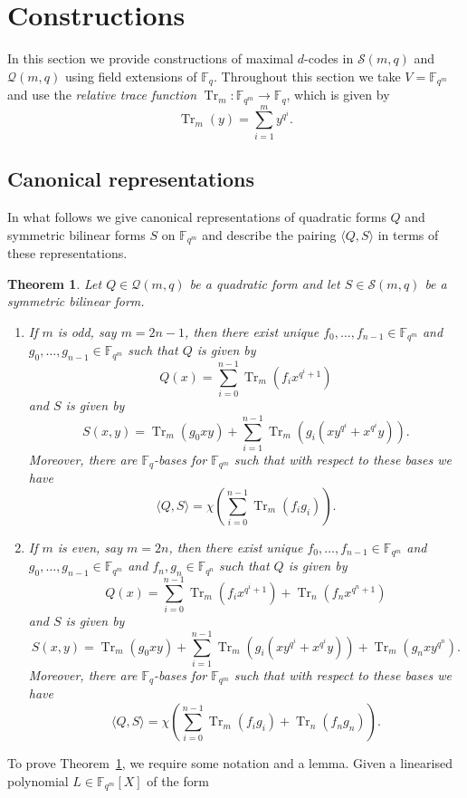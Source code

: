\documentclass[10pt]{article}
\newtheorem{theorem}{Theorem}[section]
\theoremstyle{definition}
\newcommand{\FF}{\mathbb{F}}
\newcommand{\Q}{\mathscr{Q}}
\renewcommand{\S}{\mathscr{S}}
\newcommand{\ang}[1]{\langle#1\rangle}
\DeclareMathOperator{\Tr}{Tr}
\begin{document}
\section{Constructions}
\label{sec:Constructions}

In this section we provide constructions of maximal $d$-codes in $\S(m,q)$ and $\Q(m,q)$ using field extensions of $\FF_q$. Throughout this section we take $V=\FF_{q^m}$ and use the \emph{relative trace function} $\Tr_m:\FF_{q^m}\to\FF_q$, which is given by
\[
\Tr_m(y)=\sum_{i=1}^my^{q^i}.
\]

\subsection{Canonical representations}

In what follows we give canonical representations of quadratic forms $Q$ and symmetric bilinear forms $S$ on $\FF_{q^m}$ and describe the pairing $\ang{Q,S}$ in terms of these representations.
\begin{theorem}
\label{thm:sym_quad_unique_representation}
Let $Q\in\Q(m,q)$ be a quadratic form and let $S\in\S(m,q)$ be a symmetric bilinear form.
\begin{enumerate}
\item If $m$ is odd, say $m=2n-1$, then there exist unique $f_0,\dots,f_{n-1}\in\FF_{q^m}$ and $g_0,\dots,g_{n-1}\in\FF_{q^m}$ such that $Q$ is given by
\[
Q(x)=\sum_{i=0}^{n-1}\Tr_m(f_ix^{q^i+1})
\]
and $S$ is given by
\[
S(x,y)=\Tr_m(g_0xy)+\sum_{i=1}^{n-1}\Tr_m(g_i(xy^{q^i}+x^{q^i}y)).
\]
Moreover, there are $\FF_q$-bases for $\FF_{q^m}$ such that with respect to these bases we have
\[
\ang{Q,S}=\chi\left(\sum\limits_{i=0}^{n-1}\Tr_m(f_ig_i)\right).
\]

\item If $m$ is even, say $m=2n$, then there exist unique $f_0,\dots,f_{n-1}\in\FF_{q^m}$ and $g_0,\dots,g_{n-1}\in\FF_{q^m}$ and $f_n,g_n\in\FF_{q^n}$ such that $Q$ is given by
\[
Q(x)=\sum_{i=0}^{n-1}\Tr_m(f_ix^{q^i+1})+\Tr_n(f_nx^{q^n+1})
\]
and $S$ is given by
\[
S(x,y)=\Tr_m(g_0xy)+\sum_{i=1}^{n-1}\Tr_m(g_i(xy^{q^i}+x^{q^i}y))+\Tr_m(g_nxy^{q^n}).
\]
Moreover, there are $\FF_q$-bases for $\FF_{q^m}$ such that with respect to these bases we have
\[
\ang{Q,S}=\chi\left(\sum\limits_{i=0}^{n-1}\Tr_m(f_ig_i)+\Tr_n(f_ng_n)\right).
\]
\end{enumerate}
\end{theorem}
\par
To prove Theorem~\ref{thm:sym_quad_unique_representation}, we require some notation and a lemma. Given a linearised polynomial $L\in\FF_{q^m}[X]$ of the form
\end{document}
